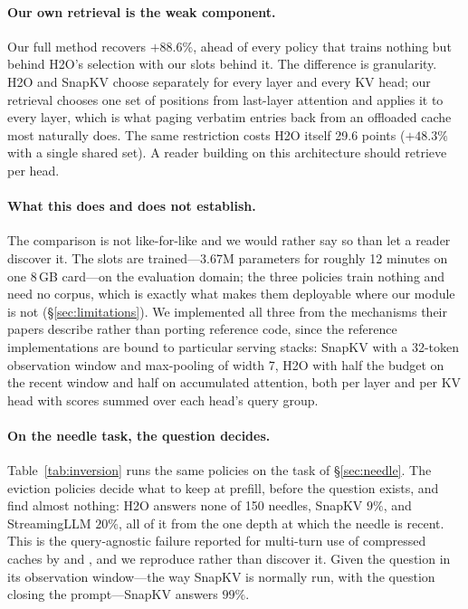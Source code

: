\documentclass[11pt]{article}
\begin{document}
\paragraph{Our own retrieval is the weak component.}
Our full method recovers $+88.6\%$, ahead of every policy that trains nothing but
behind H2O's selection with our slots behind it. The difference is granularity.
H2O and SnapKV choose separately for every layer and every KV head; our retrieval
chooses one set of positions from last-layer attention and applies it to every
layer, which is what paging verbatim entries back from an offloaded cache most
naturally does. The same restriction costs H2O itself 29.6 points ($+48.3\%$ with
a single shared set). A reader building on this architecture should retrieve
per head.

\paragraph{What this does and does not establish.}
The comparison is not like-for-like and we would rather say so than let a reader
discover it. The slots are trained---3.67M parameters for roughly 12 minutes on
one 8\,GB card---on the evaluation domain; the three policies train nothing and
need no corpus, which is exactly what makes them deployable where our module is
not (\S\ref{sec:limitations}). We implemented all three from the mechanisms their
papers describe rather than porting reference code, since the reference
implementations are bound to particular serving stacks: SnapKV with a 32-token
observation window and max-pooling of width 7, H2O with half the budget on the
recent window and half on accumulated attention, both per layer and per KV head
with scores summed over each head's query group.

\paragraph{On the needle task, the question decides.}
Table~\ref{tab:inversion} runs the same policies on the task of
\S\ref{sec:needle}. The eviction policies decide what to keep at prefill, before
the question exists, and find almost nothing: H2O answers none of 150 needles,
SnapKV $9\%$, and StreamingLLM $20\%$, all of it from the one depth at which the
needle is recent. This is the query-agnostic failure reported for multi-turn use
of compressed caches by \citet{scbench} and \citet{kvzip}, and we reproduce rather
than discover it. Given the question in its observation window---the way SnapKV
is normally run, with the question closing the prompt---SnapKV answers $99\%$.
\end{document}

